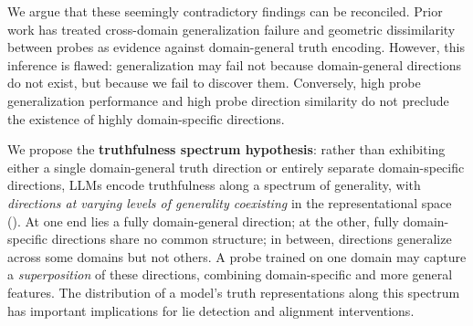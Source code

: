\documentclass{article}
\theoremstyle{plain}
\theoremstyle{definition}
\theoremstyle{remark}
\begin{document}
We argue that these seemingly contradictory findings can be reconciled. Prior work has treated cross-domain generalization failure and geometric dissimilarity between probes as evidence against domain-general truth encoding. However, this inference is flawed: generalization may fail not because domain-general directions do not exist, but because we fail to discover them. Conversely, high probe generalization performance and high probe direction similarity do not preclude the existence of highly domain-specific directions.

We propose the \textbf{truthfulness spectrum hypothesis}: rather than exhibiting either a single domain-general truth direction or entirely separate domain-specific directions, LLMs encode truthfulness along a spectrum of generality, with \textit{directions at varying levels of generality coexisting} in the representational space (). At one end lies a fully domain-general direction; at the other, fully domain-specific directions share no common structure; in between, directions generalize across some domains but not others. A probe trained on one domain may capture a \emph{superposition} of these directions, combining domain-specific and more general features. The distribution of a model's truth representations along this spectrum has important implications for lie detection and alignment interventions.

\end{document}
